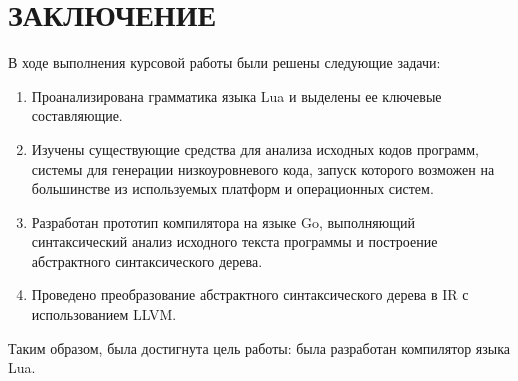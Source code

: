 \chapter*{ЗАКЛЮЧЕНИЕ}

В ходе выполнения курсовой работы были решены следующие задачи:
\begin{enumerate}
	\item Проанализирована грамматика языка Lua и выделены ее ключевые составляющие.
	\item Изучены существующие средства для анализа исходных кодов программ, системы для генерации низкоуровневого кода, запуск которого возможен на большинстве из используемых платформ и операционных систем.
	\item Разработан прототип компилятора на языке Go, выполняющий синтаксический анализ исходного текста программы и построение абстрактного синтаксического дерева.
	\item Проведено преобразование абстрактного синтаксического дерева в IR с использованием LLVM.
\end{enumerate}

Таким образом, была достигнута цель работы: была разработан компилятор языка Lua.